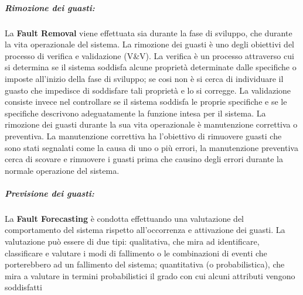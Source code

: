 \documentclass[14pt]{extarticle}
\begin{document}
\subparagraph{Rimozione dei guasti: }
La \textbf{Fault Removal} viene effettuata sia durante la fase di sviluppo, che durante la vita operazionale del sistema.
La rimozione dei guasti è uno degli obiettivi del processo di verifica e validazione (V\&V).
La verifica è un processo attraverso cui si determina se il sistema soddisfa alcune proprietà determinate dalle
specifiche o imposte all'inizio della fase di sviluppo; se cosi non è si cerca di
individuare il guasto che impedisce di soddisfare tali proprietà e lo si corregge.
La validazione consiste invece nel controllare se il sistema soddisfa le proprie
specifiche e se le specifiche descrivono adeguatamente la funzione intesa per il
sistema.
La rimozione dei 
guasti durante la sua vita operazionale è manutenzione correttiva o preventiva. La manutenzione correttiva ha l'obiettivo di rimuovere guasti che sono
stati segnalati come la causa di uno o più errori, la manutenzione preventiva
cerca di scovare e rimuovere i guasti prima che causino degli errori durante la
normale operazione del sistema.
\subparagraph{Previsione dei guasti: }
La \textbf{Fault Forecasting} è condotta effettuando una valutazione del comportamento del sistema rispetto all'occorrenza e attivazione dei guasti. La valutazione può essere di due tipi: qualitativa, che mira ad identificare, classificare
e valutare i modi di fallimento o le combinazioni di eventi che porterebbero ad
un fallimento del sistema; quantitativa (o probabilistica), che mira a valutare
in termini probabilistici il grado con cui alcuni attributi vengono soddisfatti
\end{document}
